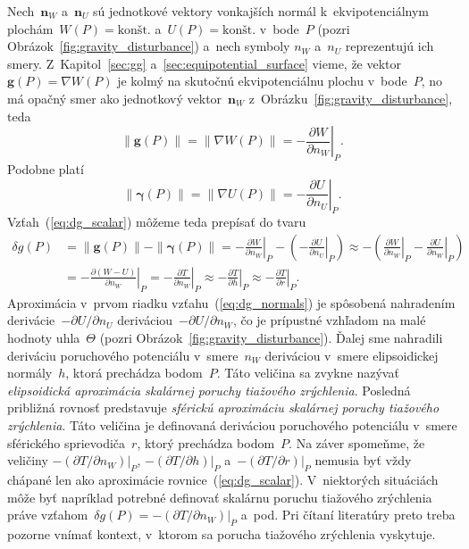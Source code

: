 \documentclass[a4paper, 12pt]{book}
\let\vec\mathbf
\begin{document}
Nech~$\vec n_W$ a~$\vec n_U$ sú jednotkové vektory vonkajších normál 
k~ekvipotenciálnym plochám~$W(P) = \textrm{konšt.}$ a~$U(P) = \textrm{konšt.}$ 
v~bode~$P$ (pozri Obrázok~\ref{fig:gravity_disturbance}) a~nech symboly $n_W$ 
a~$n_U$ reprezentujú ich smery.  Z~Kapitol~\ref{sec:gg} 
a~\ref{sec:equipotential_surface} vieme, že vektor~$\vec g(P) = \nabla W(P)$ je 
kolmý na skutočnú ekvipotenciálnu plochu v~bode~$P$, no má opačný smer ako 
jednotkový vektor~$\vec n_W$ z~Obrázku~\ref{fig:gravity_disturbance}, teda
%
\begin{equation}
\| \vec g(P) \| = \| \nabla W(P) \| = -\left.\frac{\partial W}{\partial 
n_W}\right|_P.
\end{equation}
%
Podobne platí
%
\begin{equation}
\| \boldsymbol \gamma(P) \| = \| \nabla U(P) \| = -\left.\frac{\partial 
U}{\partial n_U}\right|_P.
\end{equation}
%
Vzťah~(\ref{eq:dg_scalar}) môžeme teda prepísať do tvaru
%
\begin{equation}
\label{eq:dg_normals}
\begin{split}
\delta g(P) &= \| \vec g(P) \| - \| \boldsymbol\gamma(P) \| 
= -\left.\frac{\partial W}{\partial n_W}\right|_P - \left( 
- \left.\frac{\partial U}{\partial n_U}\right|_P\right) \approx -\left( 
\left.\frac{\partial W}{\partial n_W}\right|_P - \left.\frac{\partial 
U}{\partial n_W}\right|_P\right)\\
%
&= -\left.\frac{\partial (W - U)}{\partial n_W}\right|_P 
=  -\left.\frac{\partial T}{\partial n_W}\right|_P \approx 
-\left.\frac{\partial T}{\partial h}\right|_P \approx -\left.\frac{\partial 
T}{\partial r}\right|_P{.}
\end{split}
\end{equation}
%
Aproximácia v~prvom riadku vzťahu~(\ref{eq:dg_normals}) je spôsobená nahradením 
derivácie~$-\partial U \slash \partial n_U$ deriváciou~$-\partial U \slash 
\partial n_W$, čo je prípustné vzhľadom na malé hodnoty uhla~$\Theta$ (pozri 
Obrázok~\ref{fig:gravity_disturbance}).  Ďalej sme nahradili deriváciu 
poruchového potenciálu v~smere~$n_W$ deriváciou v~smere elipsoidickej 
normály~$h$, ktorá prechádza bodom~$P$.  Táto veličina sa zvykne nazývať 
\emph{elipsoidická aproximácia skalárnej poruchy tiažového zrýchlenia}.  
Posledná približná rovnosť predstavuje \emph{sférickú aproximáciu skalárnej 
poruchy tiažového zrýchlenia}.  Táto veličina je definovaná deriváciou 
poruchového potenciálu v~smere sférického sprievodiča~$r$, ktorý prechádza 
bodom~$P$.  Na záver spomeňme, že veličiny $-\left(\partial T \slash \partial 
n_W\right)|_P$, $-\left(\partial T \slash \partial h\right)|_P$ 
a~$-\left(\partial T \slash \partial r\right)|_P$ nemusia byť vždy chápané len 
ako aproximácie rovnice~(\ref{eq:dg_scalar}).  V~niektorých situáciách môže byť 
napríklad potrebné definovať skalárnu poruchu tiažového zrýchlenia práve 
vzťahom~$\delta g(P) = -\left(\partial T \slash \partial n_W\right)|_P$ a~pod.  
Pri čítaní literatúry preto treba pozorne vnímať kontext, v~ktorom sa porucha 
tiažového zrýchlenia vyskytuje.
\end{document}
